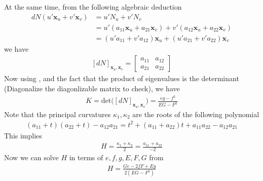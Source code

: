 \documentclass{report}
\begin{document}
\begin{mdframed}
At the same time, from the following algebraic deduction 
\begin{align*}
dN(u' \textbf{x}_u + v' \textbf{x}_v)&=u'N_u +v'N_v\\
&=u'(a_{11} \textbf{x}_u + a_{21}\textbf{x}_v)+ v'(a_{12}\textbf{x}_u+ a_{22}\textbf{x}_v)\\
&=(u'a_{11}+v'a_{12})\textbf{x}_u + (u'a_{21}+v'a_{22})\textbf{x}_v
\end{align*}
we have 
\begin{align}
\label{dN2}
  [dN]_{\textbf{x}_u,\textbf{x}_v}=\begin{bmatrix}
    a_{11} & a_{12}\\
    a_{21} & a_{22}
  \end{bmatrix}
\end{align}
Now using , and the fact that the product of eigenvalues is the determinant (Diagonalize the diagonlizable matrix to check), we have 
\begin{align*}
K=\text{det}\Big([dN]_{\textbf{x}_u,\textbf{x}_v} \Big)= \frac{eg-f^2}{EG-F^2}
\end{align*}
Note that the principal curvatures $\kappa_1,\kappa_2$ are the roots of the following polynomial
\begin{align*}
  (a_{11}+t)(a_{22}+t)-a_{12}a_{21}=t^2+ (a_{11}+a_{22})t+a_{11}a_{22}-a_{12}a_{21}
\end{align*}
This implies 
\begin{align*}
H=\frac{\kappa _1+ \kappa_2}{2}= \frac{a_{11}+a_{22}}{-2}
\end{align*}
Now we can solve $H$ in terms of $e,f,g,E,F,G$ from  
\begin{align*}
H=\frac{Ge-2fF+Eg}{2(EG-F^2)}
\end{align*}
\end{mdframed}
\end{document}
